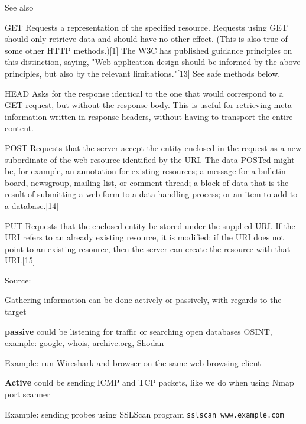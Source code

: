 \documentclass[Screen16to9,17pt]{foils}
\begin{document}


See also 


\begin{list2}
\item [GET]{\small
Requests a representation of the specified resource. Requests using GET should only retrieve data and should have no other effect. (This is also true of some other HTTP methods.)[1] The W3C has published guidance principles on this distinction, saying, "Web application design should be informed by the above principles, but also by the relevant limitations."[13] See safe methods below.}
\item [HEAD]{\small
Asks for the response identical to the one that would correspond to a GET request, but without the response body. This is useful for retrieving meta-information written in response headers, without having to transport the entire content.}
\item [POST]{\small
Requests that the server accept the entity enclosed in the request as a new subordinate of the web resource identified by the URI. The data POSTed might be, for example, an annotation for existing resources; a message for a bulletin board, newsgroup, mailing list, or comment thread; a block of data that is the result of submitting a web form to a data-handling process; or an item to add to a database.[14]}
\item [PUT]{\small
Requests that the enclosed entity be stored under the supplied URI. If the URI refers to an already existing resource, it is modified; if the URI does not point to an existing resource, then the server can create the resource with that URI.[15]}
\end{list2}

Source: 



\begin{list1}
\item Gathering information can be done actively or passively, with regards to the target
\item {\bf passive} could be listening for traffic or searching open databases OSINT, example: google, whois, archive.org, Shodan

Example: run Wireshark and browser on the same web browsing client

\vskip 1cm
\item {\bf Active} could be sending ICMP and TCP packets, like we do when using Nmap port scanner

Example: sending probes using SSLScan program \verb+sslscan www.example.com+
\end{list1}
\end{document}
